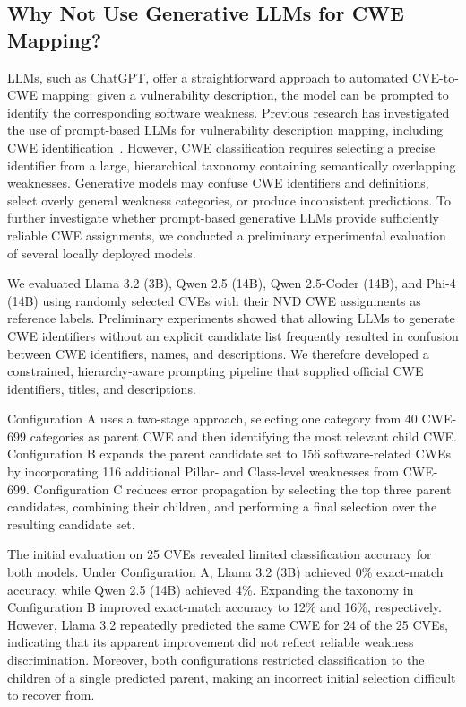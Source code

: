 \documentclass[conference,compsoc]{IEEEtran}
\begin{document}
\subsection{Why Not Use Generative LLMs for CWE Mapping?}
\label{subsec:generative_llm_limitations}


LLMs, such as ChatGPT,
offer a straightforward approach to automated CVE-to-CWE
mapping: given a vulnerability description, the model
can be prompted to identify the corresponding software
weakness. Previous research has investigated the use of
prompt-based LLMs for vulnerability description mapping,
including CWE identification~\cite{liu2023not}.
However, CWE classification requires selecting a precise
identifier from a large, hierarchical taxonomy containing
semantically overlapping weaknesses. Generative models
may confuse CWE identifiers and definitions, select
overly general weakness categories, or produce
inconsistent predictions. To further investigate whether
prompt-based generative LLMs provide sufficiently reliable
CWE assignments, we conducted a preliminary experimental
evaluation of several locally deployed models.


We evaluated Llama 3.2 (3B), Qwen 2.5 (14B),
Qwen 2.5-Coder (14B), and Phi-4 (14B) using randomly selected CVEs with their NVD CWE assignments
as reference labels. Preliminary experiments showed
that allowing LLMs to generate CWE identifiers
without an explicit candidate list frequently
resulted in confusion between CWE identifiers,
names, and descriptions. We therefore developed
a constrained, hierarchy-aware prompting pipeline
that supplied official CWE identifiers, titles,
and descriptions. 

Configuration A uses a two-stage approach, selecting one
category from 40 CWE-699 categories as parent CWE and then identifying
the most relevant child CWE. Configuration B expands
the parent candidate set to 156 software-related CWEs
by incorporating 116 additional Pillar- and Class-level
weaknesses from CWE-699. Configuration C reduces error
propagation by selecting the top three parent candidates,
combining their children, and performing a final selection
over the resulting candidate set.



The initial evaluation on 25 CVEs revealed limited
classification accuracy for both models. Under
Configuration A, Llama 3.2 (3B) achieved 0\%
exact-match accuracy, while Qwen 2.5 (14B) achieved
4\%. Expanding the taxonomy in Configuration B
improved exact-match accuracy to 12\% and 16\%,
respectively. However, Llama 3.2 repeatedly predicted
the same CWE for 24 of the 25 CVEs, indicating that
its apparent improvement did not reflect reliable
weakness discrimination. Moreover, both configurations
restricted classification to the children of a single
predicted parent, making an incorrect initial selection
difficult to recover from.
\end{document}
